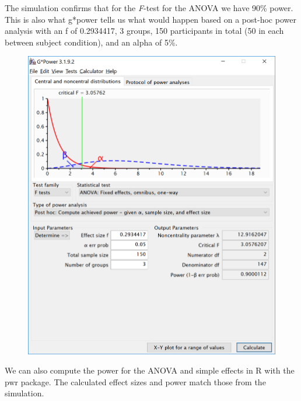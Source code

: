 \documentclass[]{article}
\newenvironment{Shaded}{\begin{snugshade}}{\end{snugshade}}
\newcommand{\KeywordTok}[1]{\textcolor[rgb]{0.13,0.29,0.53}{\textbf{#1}}}
\newcommand{\DataTypeTok}[1]{\textcolor[rgb]{0.13,0.29,0.53}{#1}}
\newcommand{\DecValTok}[1]{\textcolor[rgb]{0.00,0.00,0.81}{#1}}
\newcommand{\FloatTok}[1]{\textcolor[rgb]{0.00,0.00,0.81}{#1}}
\newcommand{\StringTok}[1]{\textcolor[rgb]{0.31,0.60,0.02}{#1}}
\newcommand{\OperatorTok}[1]{\textcolor[rgb]{0.81,0.36,0.00}{\textbf{#1}}}
\newcommand{\NormalTok}[1]{#1}
\begin{document}
The simulation confirms that for the \emph{F}-test for the ANOVA we have
90\% power. This is also what g*power tells us what would happen based
on a post-hoc power analysis with an f of 0.2934417, 3 groups, 150
participants in total (50 in each between subject condition), and an
alpha of 5\%.

\begin{figure}
\centering
\includegraphics{screenshots/gpower_7.png}
\caption{}
\end{figure}

We can also compute the power for the ANOVA and simple effects in R with
the pwr package. The calculated effect sizes and power match those from
the simulation.

\begin{Shaded}
\end{Shaded}
\end{document}
